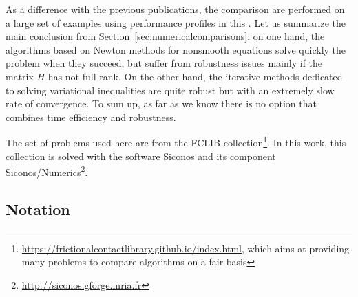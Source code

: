 As a difference with the previous publications, the comparison are performed on a large set of examples using performance profiles in this \chapterorreport{}.
{Let us summarize the main conclusion from Section~\ref{sec:numericalcomparisons}:
on one hand}, the algorithms based on Newton methods for nonsmooth equations solve quickly the problem when they succeed, but suffer from robustness issues mainly if the matrix $H$ has not full rank. On the other hand, the
iterative methods dedicated to solving variational inequalities are quite robust but with an extremely slow rate of convergence. To sum up, as far as we know there is no option that combines time efficiency and robustness.
{The set of problems used here are from the FCLIB collection\footnote{\url{https://frictionalcontactlibrary.github.io/index.html}, which aims at providing many problems to compare algorithms on a fair basis}.  In this work, this collection is solved with the software {\sc Siconos} and its component {\sc Siconos/Numerics}\footnote{\url{http://siconos.gforge.inria.fr}}\citep{Acary.Bremond.Huber.Perignon2015}.

\subsection{Notation}

}
